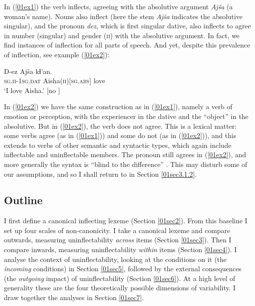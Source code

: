 \documentclass[output=paper,colorlinks,citecolor=brown]{langscibook}
\begin{document}
In (\ref{01ex1}) the verb inflects, agreeing with the absolutive argument \textit{Ajša} (a woman's name). Nouns also inflect (here the stem \textit{Ajša} indicates the absolutive singular), and the pronoun \textit{dez}, which is first singular dative, also inflects to agree in number (singular) and gender (\textsc{ii}) with the absolutive argument. In fact, we find instances of inflection for all parts of speech. And yet, despite this prevalence of inflection, see example (\ref{01ex2}):

\begin{exe}
	\ex \label{01ex2}
	\gll D-ez Ajša kɬ’an. \\
	\textsc{sg.ii}-1\textsc{sg.dat} Aisha(\textsc{ii})[\textsc{sg.abs}] love \\
	\trans ‘I love Aisha.’ \hfill [no ]
\end{exe}

In (\ref{01ex2}) we have the same construction as in (\ref{01ex1}), namely a verb of emotion or perception, with the experiencer in the dative and the ``object'' in the absolutive. But in (\ref{01ex2}), the verb does not agree. This is a lexical matter: some verbs agree (as in (\ref{01ex1})) and some do not (as in (\ref{01ex2})), and this extends to verbs of other semantic and syntactic types, which again include inflectable and uninflectable members. The pronoun still agrees in (\ref{01ex2}), and more generally the syntax is ``blind to the difference'' \citep[112]{chumakinabond2016}. This may disturb some of our assumptions, and so I shall return to  in Section \ref{01sec3.1.2}.

\subsection{Outline}

I first define a canonical inflecting lexeme (Section \ref{01sec2}). From this baseline I set up four scales of non‑canonicity. I take a canonical lexeme and compare outwards, measuring uninflectability \textit{across} items (Section \ref{01sec3}). Then I compare inwards, measuring uninflectability \textit{within} items (Section \ref{01sec4}). I analyse the context of uninflectability, looking at the conditions on it (the \textit{incoming} conditions) in Section \ref{01sec5}, followed by the external consequences (the \textit{outgoing} impact) of uninflectability (Section \ref{01sec6}). At a high level of generality these are the four theoretically possible dimensions of variability. I draw together the analyses in Section \ref{01sec7}.
\end{document}
